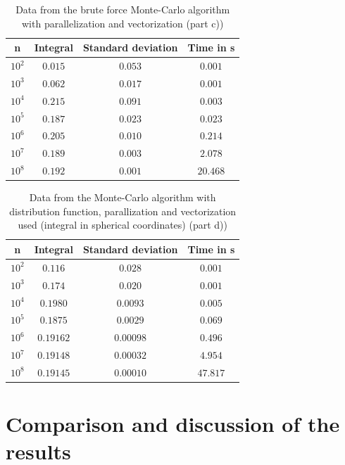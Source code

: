 \documentclass[10pt,a4paper]{article}
\begin{document}
\begin{table}[h]
\centering
\caption{Data from the brute force Monte-Carlo algorithm with parallelization and vectorization (part c))}
\label{Data from the brute force montecarlo algorithm (part c)) with vec and para}
\begin{tabular}{c|c|c|c}
n & Integral & Standard deviation & Time in s \\
\hline\hline
$10^2$ & $0.015$ & $0.053$ & $0.001$\\
$10^3$ & $0.062$ & $0.017$ & $0.001$\\
$10^4$ & $0.215$ & $0.091$ & $0.003$\\
$10^5$ & $0.187$ & $0.023$ & $0.023$\\
$10^6$ & $0.205$ & $0.010$ & $0.214$\\
$10^7$ & $0.189$ & $0.003$ & $2.078$\\
$10^8$ & $0.192$ & $0.001$ & $20.468$
\end{tabular}
\end{table}

\begin{table}[h]
\centering
\caption{Data from the Monte-Carlo algorithm with distribution function, parallization and vectorization used (integral in spherical coordinates) (part d))}
\label{Data from the  montecarlo algorithm with vectorization and parallelization (part d))}
\begin{tabular}{c|c|c|c}
n & Integral & Standard deviation & Time in s \\
\hline\hline
$10^2$ & $0.116$ & $0.028$ & $0.001$\\
$10^3$ & $0.174$ & $0.020$ & $0.001$\\
$10^4$ & $0.1980$ & $0.0093$ & $0.005$\\
$10^5$ & $0.1875$ & $0.0029$ & $0.069$\\
$10^6$ & $0.19162$ & $0.00098$ & $0.496$\\
$10^7$ & $0.19148$ & $0.00032$ & $4.954$\\
$10^8$ & $0.19145$ & $0.00010$ & $47.817$ 
\end{tabular}
\end{table}

\newpage

\section{Comparison and discussion of the results}
\end{document}
